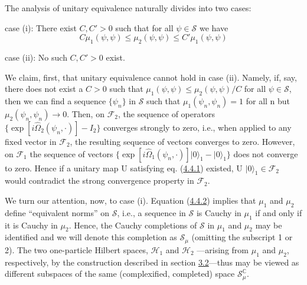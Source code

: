 \documentclass[11pt,a4paper]{article}
\begin{document}
\hypertarget{source-80}{}

The analysis of unitary equivalence naturally divides into two cases:

case (i): There exist \(C,C'>0\) such that for all \(\psi \in \mathcal{S}\) we have
\begin{equation*}
C \mu_1(\psi, \psi) \le \mu_2(\psi, \psi) \le C' \mu_1(\psi, \psi) \tag{4.4.2}\label{eq:4.4.2}
\end{equation*}

case (ii): No such \(C,C'>0\) exist.

We claim, first, that unitary equivalence cannot hold in case (ii). Namely, if, say, there does not exist a \(C>0\) such that \(\mu_1(\psi,\psi) \leq \mu_2(\psi,\psi)/C\) for all \(\psi \in \mathcal{S}\), then we can find a sequence \(\{\psi_n\}\) in \(\mathcal{S}\) such that \(\mu_1(\psi_n,\psi_n)=1\) for all n but \(\mu_2(\psi_n,\psi_n)\to 0\). Then, on \(\mathcal{F}_2\), the sequence of operators \(\{\exp[i\hat{\Omega}_2(\psi_n,\cdot)]-I_2\}\) converges strongly to zero, i.e., when applied to any fixed vector in \(\mathcal{F}_2\), the resulting sequence of vectors converges to zero. However, on \(\mathcal{F}_1\) the sequence of vectors \(\{\exp[i\hat{\Omega}_1(\psi_n,\cdot)] \lvert 0\rangle _1-\lvert 0\rangle _1\}\) does not converge to zero. Hence if a unitary map U satisfying eq. (\hyperref[eq:4.4.1]{4.4.1}) existed, U \(\lvert 0\rangle _1\in \mathcal{F}_2\) would contradict the strong convergence property in \(\mathcal{F}_2\).

We turn our attention, now, to case (i). Equation (\hyperref[eq:4.4.2]{4.4.2}) implies that \(\mu_1\) and \(\mu_2\) define ``equivalent norms'' on \(\mathcal{S}\), i.e., a sequence in \(\mathcal{S}\) is Cauchy in \(\mu_1\) if and only if it is Cauchy in \(\mu_2\). Hence, the Cauchy completions of \(\mathcal{S}\) in \(\mu_1\) and \(\mu_2\) may be identified and we will denote this completion as \(\mathcal{S}_\mu\) (omitting the subscript 1 or 2). The two one-particle Hilbert spaces, \(\mathcal{H}_1\) and \(\mathcal{H}_2\) ---arising from \(\mu_1\) and \(\mu_2\), respectively, by the construction described in section \hyperlink{sec:3.2}{3.2}---thus may be viewed as different subspaces of the same (complexified, completed) space \(\mathcal{S}_\mu^{\mathbb{C}}\).
\end{document}
